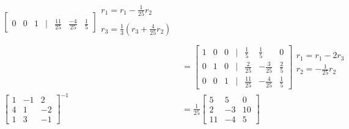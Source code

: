 \documentclass[12pt]{article}
\begin{document}
\begin{enumerate}
\begin{align*}
\begin{bmatrix}
                    \\ 0&0&1 &|& \frac{11}{25}&\frac{-4}{25}&\frac{1}{5}
                \end{bmatrix}\begin{matrix}
                r_1=r_1-\frac{1}{25}r_2
                    \\
                    \\ r_3 = \frac{1}{3}\left(r_3 + \frac{4}{25}r_2\right)
                    \\ 
                \end{matrix}
            \\ &= \begin{bmatrix}
                    1&0&0 &|& \frac{1}{5}& \frac{1}{5}&0 
                    \\ 0&1&0 &|& \frac{2}{25}&-\frac{3}{25}&\frac{2}{5}
                    \\ 0&0&1 &|& \frac{11}{25}&-\frac{4}{25}&\frac{1}{5}
                \end{bmatrix}\begin{matrix}
                r_1=r_1-2r_3
                    \\ r_2 = -\frac{1}{25}r_2
                    \\ %
                    \\ 
                \end{matrix}
            \\ \begin{bmatrix}
                1&-1&2 \\ 4&1&-2 \\ 1&3&-1
                \end{bmatrix}^{-1} 
            &= \frac{1}{25}\begin{bmatrix}
                    5& 5&0 
                    \\ 2&-3&10
                    \\  11&-4&5
                \end{bmatrix}
        \end{align*}
        

\end{enumerate}
\end{document}
